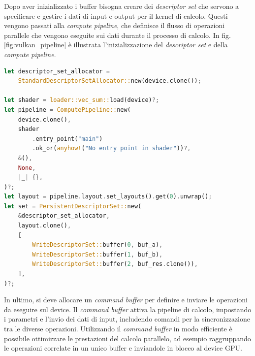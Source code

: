 Dopo aver inizializzato i buffer bisogna creare dei \textit{descriptor set} che servono a specificare e gestire i dati di input e output per il kernel di calcolo. Questi vengono passati alla \textit{compute pipeline}, che definisce il flusso di operazioni parallele che vengono eseguite sui dati durante il processo di calcolo. In  fig. \ref{fig:vulkan_pipeline} è illustrata l'inizializzazione del \textit{descriptor set} e della \textit{compute pipeline}.

\newpage 

\vspace{5mm}
\begin{lstlisting}[language=Rust, caption=Inizializzazione della compute pipeline, label=lis:vulkan_pipeline]
let descriptor_set_allocator = 
    StandardDescriptorSetAllocator::new(device.clone());

let shader = loader::vec_sum::load(device)?;
let pipeline = ComputePipeline::new(
    device.clone(),
    shader
        .entry_point("main")
        .ok_or(anyhow!("No entry point in shader"))?,
    &(),
    None,
    |_| {},
)?;
let layout = pipeline.layout.set_layouts().get(0).unwrap();
let set = PersistentDescriptorSet::new(
    &descriptor_set_allocator,
    layout.clone(),
    [
        WriteDescriptorSet::buffer(0, buf_a),
        WriteDescriptorSet::buffer(1, buf_b),
        WriteDescriptorSet::buffer(2, buf_res.clone()),
    ],
)?;
\end{lstlisting}
\vspace{5mm}

In ultimo, si deve allocare un \textit{command buffer} per definire e inviare le operazioni da eseguire sul device. Il \textit{command buffer} attiva la pipeline di calcolo, impostando i parametri e l'invio dei dati di input, includendo comandi per la sincronizzazione tra le diverse operazioni. Utilizzando il \textit{command buffer} in modo efficiente è possibile ottimizzare le prestazioni del calcolo parallelo, ad esempio raggruppando le operazioni correlate in un unico buffer e inviandole in blocco al device GPU.

